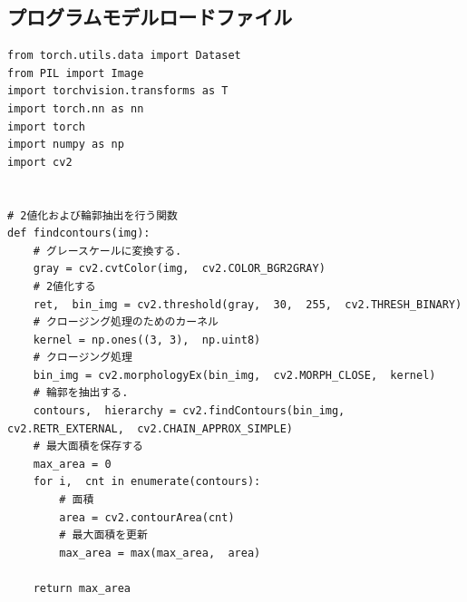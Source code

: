 \documentclass[dvipdfmx]{jsarticle}
\begin{document}
\subsection{プログラムモデルロードファイル}
\begin{lstlisting}
from torch.utils.data import Dataset
from PIL import Image
import torchvision.transforms as T
import torch.nn as nn
import torch
import numpy as np
import cv2


# 2値化および輪郭抽出を行う関数
def findcontours(img):
    # グレースケールに変換する.
    gray = cv2.cvtColor(img,  cv2.COLOR_BGR2GRAY)
    # 2値化する
    ret,  bin_img = cv2.threshold(gray,  30,  255,  cv2.THRESH_BINARY)
    # クロージング処理のためのカーネル
    kernel = np.ones((3, 3),  np.uint8)
    # クロージング処理
    bin_img = cv2.morphologyEx(bin_img,  cv2.MORPH_CLOSE,  kernel)
    # 輪郭を抽出する.
    contours,  hierarchy = cv2.findContours(bin_img,  cv2.RETR_EXTERNAL,  cv2.CHAIN_APPROX_SIMPLE)
    # 最大面積を保存する
    max_area = 0
    for i,  cnt in enumerate(contours):
        # 面積
        area = cv2.contourArea(cnt)
        # 最大面積を更新
        max_area = max(max_area,  area)
    
    return max_area


\end{lstlisting}
\end{document}
